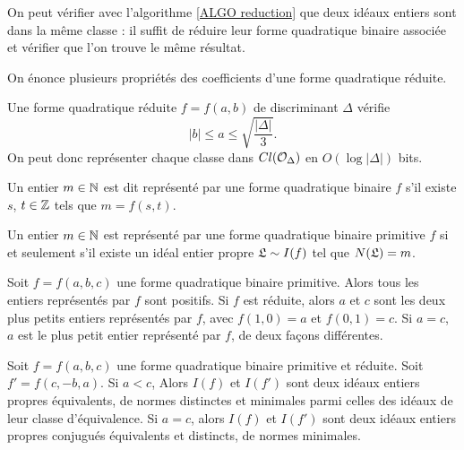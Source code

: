 \begin{Rem}
	On peut vérifier avec l'algorithme \ref{ALGO reduction} que deux idéaux entiers sont dans la même classe : il suffit de réduire leur forme quadratique binaire associée et vérifier que l'on trouve le même résultat. 
\end{Rem}

On énonce plusieurs propriétés des coefficients d'une forme quadratique réduite. 

\begin{Prop}\label{tailleCoefReduit}
	Une forme quadratique réduite $f = f(a,b)$ de discriminant $\Delta$ vérifie 
	\begin{equation*}
		|b|\leq a\leq\sqrt{\frac{|\Delta|}{3}}.
	\end{equation*}
	On peut donc représenter chaque classe dans $Cl(\mathcal{O}_{\Delta})$ en $O(\log|\Delta|)$ bits. 
\end{Prop}

\begin{Def}
	Un entier $m\in\mathbb{N}$ est dit représenté par une forme quadratique binaire $f$ s'il existe $s$, $t\in\mathbb{Z}$ tels que $m = f(s,t)$.
\end{Def}

\begin{Prop}
	
	Un entier $m\in\mathbb{N}$ est représenté par une forme quadratique binaire primitive $f$ si et seulement s'il existe un idéal entier propre $\mathfrak{L}\sim I(f)$ tel que $N(\mathfrak{L}) = m$.
\end{Prop}

\begin{Prop}\label{représentationEntierMinimaux}
	
	Soit $f = f(a,b,c)$ une forme quadratique binaire primitive. Alors tous les entiers représentés par $f$ sont positifs. Si $f$ est réduite, alors $a$ et $c$ sont les deux plus petits entiers représentés par $f$, avec $f(1,0) = a$ et $f(0,1) = c$. Si $a = c$, $a$ est le plus petit entier représenté par $f$, de deux façons différentes.
\end{Prop}

\begin{Coro}\label{formesIdéauxMinimaux}
	Soit $f = f(a,b,c)$ une forme quadratique binaire primitive et réduite. Soit $f' = f(c,-b,a)$. Si $a < c$, Alors $I(f)$ et $I(f')$ sont deux idéaux entiers propres équivalents, de normes distinctes et minimales parmi celles des idéaux de leur classe d'équivalence. Si $a = c$, alors $I(f)$ et $I(f')$ sont deux idéaux entiers propres conjugués équivalents et distincts, de normes minimales. 
\end{Coro}

